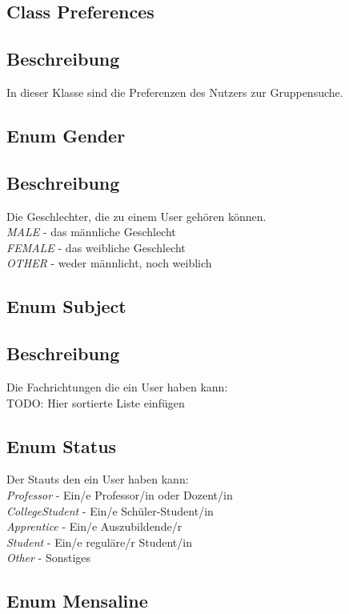 \documentclass[a4paper]{scrreprt}
\begin{document}
\subsection{Class Preferences}
\subsection*{Beschreibung}
In dieser Klasse sind die Preferenzen des Nutzers zur Gruppensuche.

\subsection{Enum Gender}
\subsection*{Beschreibung}
Die Geschlechter, die zu einem User gehören können. \\
\textit{MALE} - das männliche Geschlecht \\
\textit{FEMALE} - das weibliche Geschlecht \\
\textit{OTHER} - weder männlicht, noch weiblich \\

\subsection{Enum Subject}
\subsection*{Beschreibung}
Die Fachrichtungen die ein User haben kann: \\
TODO: Hier sortierte Liste einfügen

\subsection{Enum Status}
Der Stauts den ein User haben kann: \\
\textit{Professor} - Ein/e Professor/in oder Dozent/in \\
\textit{CollegeStudent} -  Ein/e Schüler-Student/in \\
\textit{Apprentice} - Ein/e Auszubildende/r \\
\textit{Student} - Ein/e reguläre/r Student/in \\
\textit{Other} - Sonstiges \\

\subsection{Enum Mensaline}
\end{document}

